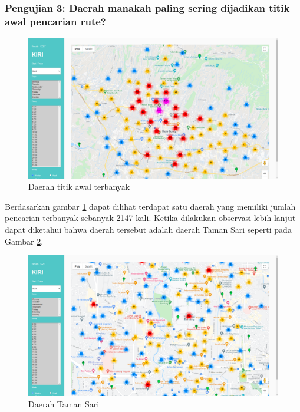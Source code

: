 \subsubsection{Pengujian 3: Daerah manakah paling sering dijadikan titik awal pencarian rute?}
\label{subsec:pengujian3}
\begin{figure}[H]
	\centering  
	\includegraphics[scale=0.3]{Gambar/pengujian/titik-tujuan-terbanyak.png}  
	\caption[Daerah titik awal terbanyak]{Daerah titik awal terbanyak } 
	\label{fig:titkAwal}
\end{figure}
Berdasarkan gambar \ref{fig:titkAwal} dapat dilihat terdapat satu daerah yang memiliki jumlah pencarian terbanyak sebanyak 2147 kali. Ketika dilakukan observasi lebih lanjut dapat diketahui bahwa daerah tersebut adalah daerah Taman Sari seperti pada Gambar \ref{fig:tamanSari}.

\begin{figure}[H]
	\centering  
	\includegraphics[scale=0.3]{Gambar/pengujian/taman-sari.png}  
	\caption[Daerah Taman Sari]{Daerah Taman Sari} 
	\label{fig:tamanSari}
\end{figure}

